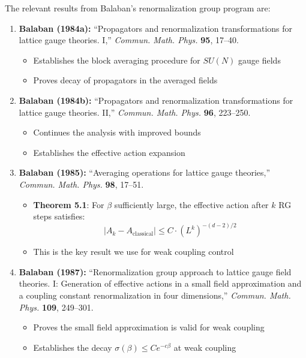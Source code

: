 \begin{remark}
\label{rem:balaban-refs}
The relevant results from Balaban's renormalization group program are:

\begin{enumerate}
\item \textbf{Balaban (1984a):} ``Propagators and renormalization transformations 
for lattice gauge theories. I,'' \textit{Commun. Math. Phys.} \textbf{95}, 17--40.
\begin{itemize}
\item Establishes the block averaging procedure for $SU(N)$ gauge fields
\item Proves decay of propagators in the averaged fields
\end{itemize}

\item \textbf{Balaban (1984b):} ``Propagators and renormalization transformations 
for lattice gauge theories. II,'' \textit{Commun. Math. Phys.} \textbf{96}, 223--250.
\begin{itemize}
\item Continues the analysis with improved bounds
\item Establishes the effective action expansion
\end{itemize}

\item \textbf{Balaban (1985):} ``Averaging operations for lattice gauge theories,'' 
\textit{Commun. Math. Phys.} \textbf{98}, 17--51.
\begin{itemize}
\item \textbf{Theorem 5.1}: For $\beta$ sufficiently large, the effective action 
after $k$ RG steps satisfies:
\begin{equation}
|A_k - A_{\text{classical}}| \leq C \cdot (L^k)^{-(d-2)/2}
\end{equation}
\item This is the key result we use for weak coupling control
\end{itemize}

\item \textbf{Balaban (1987):} ``Renormalization group approach to lattice gauge 
field theories. I: Generation of effective actions in a small field approximation 
and a coupling constant renormalization in four dimensions,'' 
\textit{Commun. Math. Phys.} \textbf{109}, 249--301.
\begin{itemize}
\item Proves the small field approximation is valid for weak coupling
\item Establishes the decay $\sigma(\beta) \leq C e^{-c\beta}$ at weak coupling
\end{itemize}


\end{enumerate}
\end{remark}
